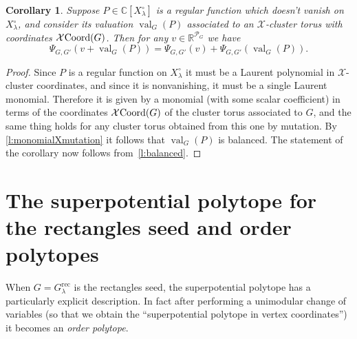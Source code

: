 \documentclass{amsart}
\newtheorem{corollary}[thm]{Corollary}
\theoremstyle{definition}
\numberwithin{equation}{section}
\newcommand{\R}{\mathbb R}
\newcommand{\rect}{\mathrm{rec}}
\newcommand{\C}{\mathbb{C}}
\newcommand{\val}{{\operatorname{val}}}
\newcommand{\TB}{{\mathcal X\hskip -.05cm\operatorname{Coord}}}
\begin{document}
\begin{corollary}\label{c:balanced} Suppose 
$P\in\C[X_\lambda^\circ]$ is a regular function 
	which doesn't vanish
	on $X_{\lambda}^\circ$, and consider its valuation $\val_G(P)$ associated to an $\mathcal X$-cluster torus with coordinates $\TB(G)$. Then 
for any $v\in\R^{\mathcal P_G}$ we have
\[
\Psi_{G,G'}(v+\val_G(P))=\Psi_{G,G'}(v)+\Psi_{G,G'}(\val_G(P)).
\]
\end{corollary}
\begin{proof}
Since $P$ is a regular function on $X_\lambda^\circ$ it must 
be a Laurent polynomial
in $\mathcal X$-cluster coordinates, and since it is nonvanishing, it must
be a single Laurent monomial. 
Therefore it is given by a monomial (with some scalar coefficient) in terms of the coordinates $\TB(G)$ of the cluster torus associated to $G$, and the same thing holds for any cluster torus obtained from this one by mutation. By \cref{l:monomialXmutation} it follows that $\val_G(P)$ is balanced. The statement of the corollary now follows from~\cref{l:balanced}.
\end{proof}









\section{The superpotential polytope for the rectangles seed and order polytopes}\label{sec:rectangles}

When $G = G_{\lambda}^{\rect}$ is the rectangles seed, the superpotential polytope
has a particularly explicit description.  In fact after performing a unimodular 
change of variables (so that we obtain the ``superpotential polytope in vertex coordinates'')
it becomes an \emph{order polytope}.
\end{document}
